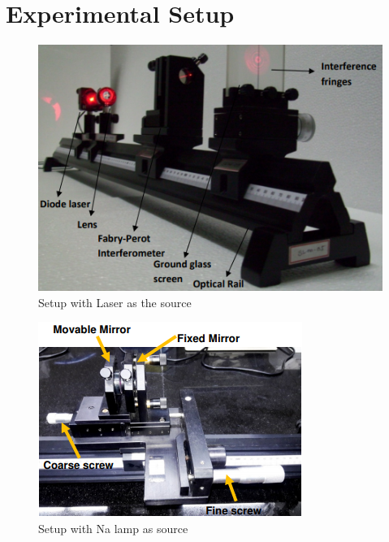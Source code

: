 \documentclass{article}
\begin{document}
\section{Experimental Setup}
\begin{figure}[h!]
    \centering
    \includegraphics[scale = 0.65]{Figures/setup.png}
    \caption{Setup with Laser as the source}
    \label{fig:setup}
\end{figure}
\begin{figure}[h!]
    \centering
    \includegraphics[scale = 1]{Figures/interfero.png}
    \caption{Setup with Na lamp as source}
    \label{fig:interfero}
\end{figure}
\end{document}
